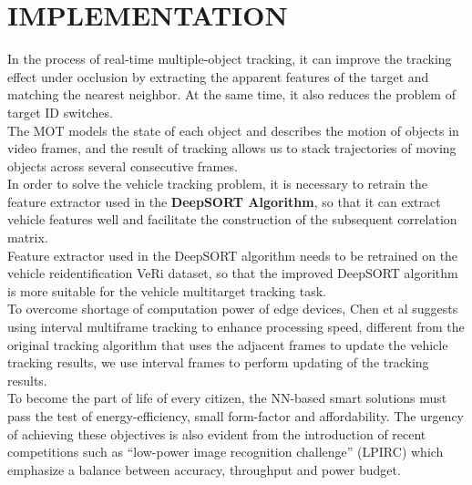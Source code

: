 \chapter{IMPLEMENTATION}

\renewcommand{\headrulewidth}{0.5pt}
\renewcommand{\footrulewidth}{0.5pt}
\thispagestyle{plain}
\pagestyle{fancy}
\fancyhf{}
\raggedright
{}

In the process of real-time multiple-object tracking, it can improve the tracking effect under occlusion by extracting the apparent features of the target and matching the nearest neighbor. At the same time, it also reduces the problem of target ID switches. \\ 
\vspace{3mm}
The MOT models the state of each object and describes the motion of objects in video frames, and the result of tracking allows us to stack trajectories of moving objects across several consecutive frames. \\ 
\vspace{3mm}
In order to solve the vehicle tracking problem, it is necessary to retrain the feature extractor used in the \textbf{DeepSORT Algorithm}, so that it can extract vehicle features well and facilitate the construction of the subsequent correlation matrix. \\ 
\vspace{3mm}
Feature extractor used in the DeepSORT algorithm needs to be retrained on the vehicle reidentification VeRi dataset, so that the improved DeepSORT algorithm is more suitable for the vehicle multitarget tracking task. \\ 
\vspace{3mm}
To overcome shortage of computation power of edge devices, Chen et al suggests using interval multiframe tracking to enhance processing speed, different from the original tracking algorithm that uses the adjacent frames to update the vehicle tracking results, 
we use interval frames to perform updating of the tracking results. \\ 
\vspace{3mm}
To become the part of life of every citizen, the NN-based smart solutions must pass the test of energy-efficiency, small form-factor and affordability. The urgency of achieving these objectives is also evident from the introduction of recent competitions 
such as “low-power image recognition challenge” (LPIRC) which emphasize a balance between accuracy, throughput and power budget. \\ 
